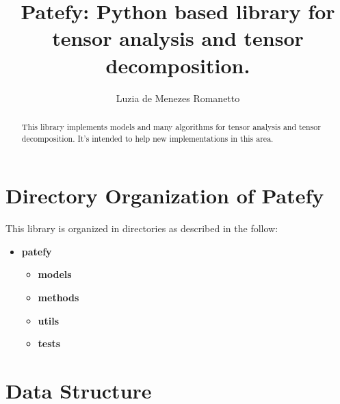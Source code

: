 \documentclass[a4paper,10pt]{report}
\title{Patefy: Python based library for tensor analysis and tensor decomposition.}
\author{Luzia de Menezes Romanetto}
\begin{document}
\maketitle

\begin{abstract}
This library implements models and many algorithms for tensor analysis and tensor decomposition. It's intended to 
help new implementations in this area.
\end{abstract}

\section{Directory Organization of Patefy}

This library is organized in directories as described in the follow:

\begin{itemize}
 \item \textbf{patefy}
 \begin{itemize}
  \item \textbf{models}
  \item \textbf{methods}
  \item \textbf{utils}
  \item \textbf{tests}
 \end{itemize}
\end{itemize}

\section{Data Structure}
\end{document}
